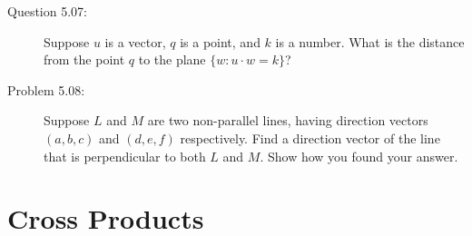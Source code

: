 \documentclass{article}
\begin{document}
\begin{description}
  \item[Question 5.07:] Suppose $u$ is a vector, $q$ is a point, and $k$ is a number. What is the distance from the point $q$ to the plane $\{ w: u \cdot w = k \}$?

  \item[Problem 5.08:] Suppose $L$ and $M$ are two non-parallel lines, having direction vectors $(a,b,c)$ and $(d,e,f)$ respectively. Find a direction vector of the line that is perpendicular to both $L$ and $M$. Show how you found your answer.

\end{description}


\section{Cross Products}
\end{document}

